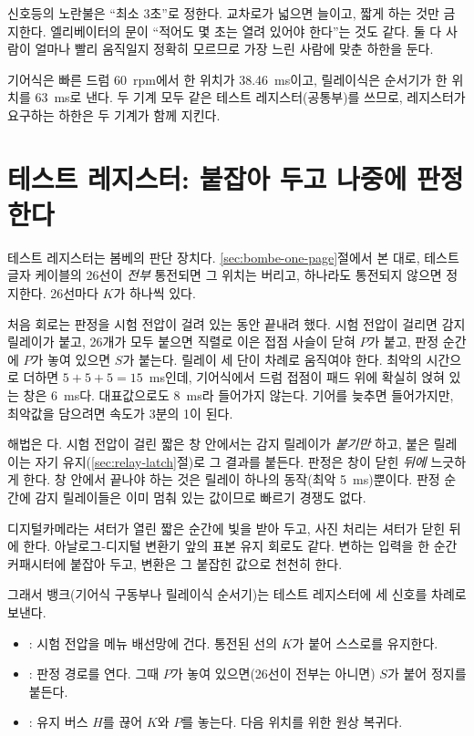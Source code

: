 \General 신호등의 노란불은 ``최소 3초''로 정한다. 교차로가 넓으면 늘이고, 짧게 하는 것만 금지한다. 엘리베이터의
문이 ``적어도 몇 초는 열려 있어야 한다''는 것도 같다. 둘 다 사람이 얼마나 빨리 움직일지 정확히 모르므로
가장 느린 사람에 맞춘 하한을 둔다.

\Ours 기어식은 빠른 드럼 60~rpm에서 한 위치가 38.46~ms이고, 릴레이식은 순서기가 한 위치를 63~ms로 낸다.
두 기계 모두 같은 테스트 레지스터(공통부)를 쓰므로, 레지스터가 요구하는 하한은 두 기계가 함께 지킨다.

\section{테스트 레지스터: 붙잡아 두고 나중에 판정한다}\label{sec:t-register}

테스트 레지스터는 봄베의 판단 장치다. \ref{sec:bombe-one-page}절에서 본 대로, 테스트 글자 케이블의 26선이
\emph{전부} 통전되면 그 위치는 버리고, 하나라도 통전되지 않으면 정지한다. 26선마다  $K$가 하나씩 있다.

\Why 처음 회로는 판정을 시험 전압이 걸려 있는 동안 끝내려 했다. 시험 전압이 걸리면 감지 릴레이가 붙고, 26개가
모두 붙으면 직렬로 이은 접점 사슬이 닫혀  $P$가 붙고, 판정 순간에 $P$가 놓여
있으면  $S$가 붙는다. 릴레이 세 단이 차례로 움직여야 한다. 최악의 시간으로 더하면
$5 + 5 + 5 = 15$~ms인데, 기어식에서 드럼 접점이 패드 위에 확실히 얹혀 있는 창은 6~ms다. 대표값으로도
8~ms라 들어가지 않는다. 기어를 늦추면 들어가지만, 최악값을 담으려면 속도가 3분의 1이 된다.

해법은 다. 시험 전압이 걸린 짧은 창 안에서는 감지 릴레이가 \emph{붙기만} 하고,
붙은 릴레이는 자기 유지(\ref{sec:relay-latch}절)로 그 결과를 붙든다. 판정은 창이 닫힌 \emph{뒤에} 느긋하게 한다.
창 안에서 끝나야 하는 것은 릴레이 하나의 동작(최악 5~ms)뿐이다. 판정 순간에 감지 릴레이들은 이미 멈춰 있는
값이므로 빠르기 경쟁도 없다.

\General 디지털카메라는 셔터가 열린 짧은 순간에 빛을 받아 두고, 사진 처리는 셔터가 닫힌 뒤에 한다. 아날로그-디지털
변환기 앞의 표본 유지 회로도 같다. 변하는 입력을 한 순간 커패시터에 붙잡아 두고, 변환은 그 붙잡힌 값으로
천천히 한다.

\Ours 그래서 뱅크(기어식 구동부나 릴레이식 순서기)는 테스트 레지스터에 세 신호를 차례로 보낸다.

\begin{itemize}
\item {}: 시험 전압을 메뉴 배선망에 건다. 통전된 선의 $K$가 붙어 스스로를 유지한다.
\item {}: 판정 경로를 연다. 그때 $P$가 놓여 있으면(26선이 전부는 아니면) $S$가 붙어 정지를 붙든다.
\item {}: 유지 버스 $H$를 끊어 $K$와 $P$를 놓는다. 다음 위치를 위한 원상 복귀다.
\end{itemize}

